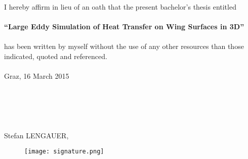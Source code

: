 
I hereby affirm in lieu of an oath that the present bachelor's thesis entitled\\
\\
\textbf{``Large Eddy Simulation of Heat Transfer on Wing Surfaces in 3D''}\\
\\
has been written by myself without the use of any other resources than those indicated, quoted and referenced.\\
\\
Graz, 16 March 2015\\
\\
\\
\\
\\
\\
Stefan LENGAUER,
\begin{figure}[ht]
\texttt{[image: signature.png]}
\end{figure}
